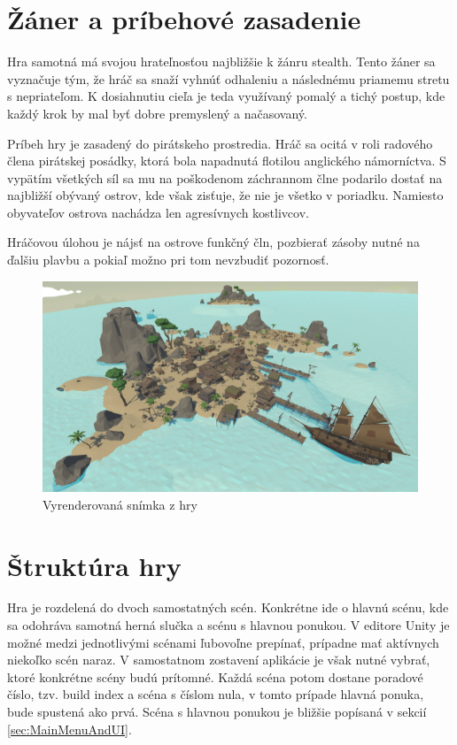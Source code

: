 \documentclass[slovak, master]{diploma}
\begin{document}
\section{Žáner a príbehové zasadenie}
\label{sec:GenreAndSetting}
Hra samotná má svojou hrateľnosťou najbližšie k žánru stealth. Tento žáner sa vyznačuje tým, že hráč sa snaží vyhnúť odhaleniu a následnému priamemu stretu s nepriateľom. K dosiahnutiu cieľa je teda využívaný pomalý a tichý postup, kde každý krok by mal byť dobre premyslený a načasovaný. 

Príbeh hry je zasadený do pirátskeho prostredia. Hráč sa ocitá v roli radového člena pirátskej posádky, ktorá bola napadnutá flotilou anglického námorníctva. S vypätím všetkých síl sa mu na poškodenom záchrannom člne podarilo dostať na najbližší obývaný ostrov, kde však zisťuje, že nie je všetko v poriadku. Namiesto obyvateľov ostrova nachádza len agresívnych kostlivcov. 

Hráčovou úlohou je nájsť na ostrove funkčný čln, pozbierať zásoby nutné na ďalšiu plavbu a pokiaľ možno pri tom nevzbudiť pozornosť.

\begin{figure}[!htbp]
	\centering
	\includegraphics[width=.9\textwidth]{Figures/game_compressed.png}
	\caption{Vyrenderovaná snímka z hry}
	\label{pic:GameScreenshot}
\end{figure}

\section{Štruktúra hry}
\label{sec:GameStructure}
Hra je rozdelená do dvoch samostatných scén. Konkrétne ide o hlavnú scénu, kde sa odohráva samotná herná slučka a scénu s hlavnou ponukou. V editore Unity je možné medzi jednotlivými scénami ľubovoľne prepínať, prípadne mať aktívnych niekoľko scén naraz. V samostatnom zostavení aplikácie je však nutné vybrať, ktoré konkrétne scény budú prítomné. Každá scéna potom dostane poradové číslo, tzv. build index a scéna s číslom nula, v tomto prípade hlavná ponuka, bude spustená ako prvá. Scéna s hlavnou ponukou je bližšie popísaná v sekcií \ref{sec:MainMenuAndUI}.
\end{document}
